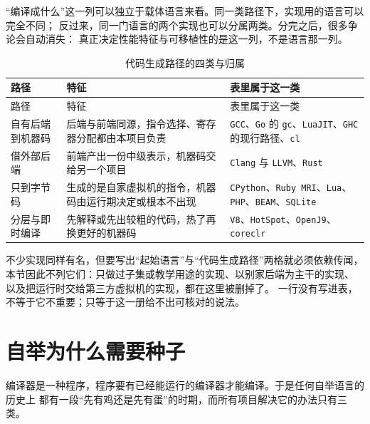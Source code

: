 \documentclass[12pt,a4paper,fontset=fandol]{ctexbook}
\newcommand{\Tool}[1]{\texttt{#1}}
\begin{document}
“编译成什么”这一列可以独立于载体语言来看。同一类路径下，实现用的语言可以完全不同；
反过来，同一门语言的两个实现也可以分属两类。分完之后，很多争论会自动消失：
真正决定性能特征与可移植性的是这一列，不是语言那一列。

\begin{longtable}{@{}>{\raggedright\arraybackslash}p{} >{\raggedright\arraybackslash}p{} >{\raggedright\arraybackslash}p{}@{}}
\caption{代码生成路径的四类与归属}\label{tab:apC-paths}\\
\toprule
路径 & 特征 & 表里属于这一类 \\
\midrule
\endfirsthead
\toprule
路径 & 特征 & 表里属于这一类 \\
\midrule
\endhead
\bottomrule
\endfoot
自有后端到机器码 & 后端与前端同源，指令选择、寄存器分配都由本项目负责 &
\Tool{GCC}、\Tool{Go} 的 \Tool{gc}、\Tool{LuaJIT}、\Tool{GHC} 的现行路径、\Tool{cl} \\
借外部后端 & 前端产出一份中级表示，机器码交给另一个项目 &
\Tool{Clang} 与 \Tool{LLVM}、\Tool{Rust} \\
只到字节码 & 生成的是自家虚拟机的指令，机器码由运行期决定或根本不出现 &
\Tool{CPython}、\Tool{Ruby MRI}、\Tool{Lua}、\Tool{PHP}、\Tool{BEAM}、\Tool{SQLite} \\
分层与即时编译 & 先解释或先出较粗的代码，热了再换更好的机器码 &
\Tool{V8}、\Tool{HotSpot}、\Tool{OpenJ9}、\Tool{coreclr} \\
\end{longtable}

\begin{note}[title=这张表故意没收录的东西]
不少实现同样有名，但要写出“起始语言”与“代码生成路径”两格就必须依赖传闻，
本节因此不列它们：只做过子集或教学用途的实现、以别家后端为主干的实现、
以及把运行时交给第三方虚拟机的实现，都在这里被删掉了。
一行没有写进表，不等于它不重要；只等于这一册给不出可核对的说法。
\end{note}

\section{自举为什么需要种子}

编译器是一种程序，程序要有已经能运行的编译器才能编译。于是任何自举语言的历史上
都有一段“先有鸡还是先有蛋”的时期，而所有项目解决它的办法只有三类。
\end{document}
